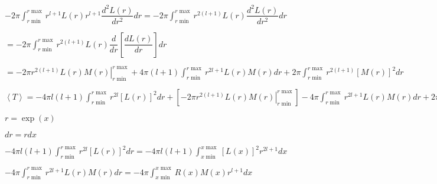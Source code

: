 \documentclass{jarticle}%
\begin{document}
$-2\pi%
{\displaystyle\int\nolimits_{r\min}^{r\max}}
r^{l+1}L\left(  r\right)  r^{l+1}\dfrac{d^{2}L\left(  r\right)  }{dr^{2}%
}dr=-2\pi%
{\displaystyle\int\nolimits_{r\min}^{r\max}}
r^{2\left(  l+1\right)  }L\left(  r\right)  \dfrac{d^{2}L\left(  r\right)
}{dr^{2}}dr$

$=-2\pi%
{\displaystyle\int\nolimits_{r\min}^{r\max}}
r^{2\left(  l+1\right)  }L\left(  r\right)  \dfrac{d}{dr}\left[
\dfrac{dL\left(  r\right)  }{dr}\right]  dr$

$=\left.  -2\pi r^{2\left(  l+1\right)  }L\left(  r\right)  M\left(  r\right)
\right\vert _{r\min}^{r\max}+4\pi\left(  l+1\right)
{\displaystyle\int\nolimits_{r\min}^{r\max}}
r^{2l+1}L\left(  r\right)  M\left(  r\right)  dr+2\pi%
{\displaystyle\int\nolimits_{r\min}^{r\max}}
r^{2\left(  l+1\right)  }\left[  M\left(  r\right)  \right]  ^{2}dr$

$\left\langle T\right\rangle =-4\pi l\left(  l+1\right)
{\displaystyle\int\nolimits_{r\min}^{r\max}}
r^{2l}\left[  L\left(  r\right)  \right]  ^{2}dr+\left[  \left.  -2\pi
r^{2\left(  l+1\right)  }L\left(  r\right)  M\left(  r\right)  \right\vert
_{r\min}^{r\max}\right]  -4\pi%
{\displaystyle\int\nolimits_{r\min}^{r\max}}
r^{2l+1}L\left(  r\right)  M\left(  r\right)  dr+2\pi%
{\displaystyle\int\nolimits_{r\min}^{r\max}}
r^{2\left(  l+1\right)  }\left[  M\left(  r\right)  \right]  ^{2}dr$

$r=\exp\left(  x\right)  $

$dr=rdx$

$-4\pi l\left(  l+1\right)
{\displaystyle\int\nolimits_{r\min}^{r\max}}
r^{2l}\left[  L\left(  r\right)  \right]  ^{2}dr=-4\pi l\left(  l+1\right)
{\displaystyle\int\nolimits_{x\min}^{x\max}}
\left[  L\left(  x\right)  \right]  ^{2}r^{2l+1}dx$

$-4\pi%
{\displaystyle\int\nolimits_{r\min}^{r\max}}
r^{2l+1}L\left(  r\right)  M\left(  r\right)  dr=-4\pi%
{\displaystyle\int\nolimits_{x\min}^{x\max}}
R\left(  x\right)  M\left(  x\right)  r^{l+1}dx$
\end{document}

